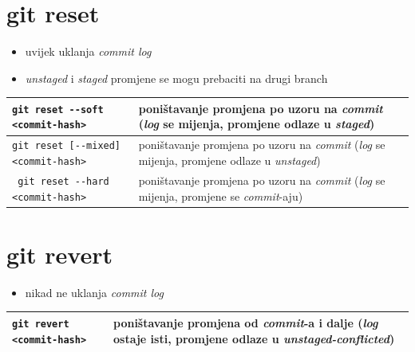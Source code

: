 \documentclass[10pt]{article}
\begin{document}
    \section*{\color{BrickRed} git reset}
    \begin{itemize}
        \item uvijek uklanja \textit{commit log}
        \item \textit{unstaged} i \textit{staged} promjene se mogu prebaciti na drugi branch
    \end{itemize}
    \begin{tabular}{|>{\tt}p{9.00cm}|>{}p{15.50cm}|}
        \hline
        git reset -{}-soft <commit-hash>                & poništavanje promjena po uzoru na \textit{commit} (\textit{log} se mijenja, promjene odlaze u \textit{staged}) \\ \hline
        git reset [-{}-mixed] <commit-hash>             & poništavanje promjena po uzoru na \textit{commit} (\textit{log} se mijenja, promjene odlaze u \textit{unstaged}) \\ \hline
        git reset -{}-hard <commit-hash>                & poništavanje promjena po uzoru na \textit{commit} (\textit{log} se mijenja, promjene se \textit{commit}-aju) \\ \hline
    \end{tabular}

    \section*{\color{BrickRed} git revert}
    \begin{itemize}
        \item nikad ne uklanja \textit{commit log}
    \end{itemize}
    \begin{tabular}{|>{\tt}p{9.00cm}|>{}p{15.50cm}|}
        \hline
        git revert <commit-hash>                        & poništavanje promjena od \textit{commit}-a i dalje (\textit{log} ostaje isti, promjene odlaze u \textit{unstaged-conflicted}) \\ \hline
    \end{tabular}
\end{document}
